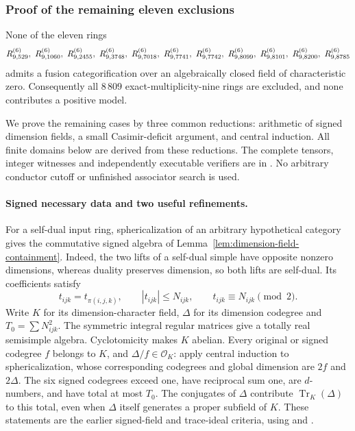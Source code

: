 \subsubsection{Proof of the remaining eleven exclusions}
\label{sec:m9-completion}

\begin{theorem}\label{thm:m9-completion}
None of the eleven rings
\[
 \RR{9}{529},\ \RR{9}{1060},\ \RR{9}{2455},\ \RR{9}{3748},\
 \RR{9}{7018},\ \RR{9}{7741},\ \RR{9}{7742},\
 \RR{9}{8099},\ \RR{9}{8101},\ \RR{9}{8200},\ \RR{9}{8785}
\]
admits a fusion categorification over an algebraically closed field of
characteristic zero. Consequently all $8\,809$ exact-multiplicity-nine
rings are excluded, and none contributes a positive model.
\end{theorem}

We prove the remaining cases by three common reductions: arithmetic of
signed dimension fields, a small Casimir-deficit argument, and central
induction. All finite domains below are derived from these reductions.
The complete tensors, integer witnesses and independently executable
verifiers are in \filename{research/exclusions/m9_completion/}.
No arbitrary conductor cutoff or unfinished associator search is used.

\paragraph{Signed necessary data and two useful refinements.}
For a self-dual input ring, sphericalization of an arbitrary hypothetical
category gives the commutative signed algebra of
Lemma~\ref{lem:dimension-field-containment}. Indeed, the two lifts of a
self-dual simple have opposite nonzero dimensions, whereas duality
preserves dimension, so both lifts are self-dual. Its coefficients satisfy
\[
 t_{ijk}=t_{\pi(i,j,k)},\qquad |t_{ijk}|\le N_{ijk},\qquad
 t_{ijk}\equiv N_{ijk}\pmod2.
\]
Write $K$ for its dimension-character field, $\Delta$ for its dimension
codegree and $T_0=\sum N_{ijk}^2$. The symmetric integral regular matrices
give a totally real semisimple algebra. Cyclotomicity makes $K$ abelian.
Every original or signed codegree $f$ belongs to $K$, and
$\Delta/f\in\mathcal O_K$: apply central induction to sphericalization,
whose corresponding codegrees and global dimension are $2f$ and
$2\Delta$. The six signed codegrees exceed one, have reciprocal sum one,
are $d$-numbers, and have total at most $T_0$. The conjugates of $\Delta$
contribute $\operatorname{Tr}_K(\Delta)$ to this total, even when
$\Delta$ itself generates a proper subfield of $K$.
These statements are the earlier signed-field and trace-ideal criteria,
using \cite[Section~5.1 and Theorem~2.13]{Ostrik3} and
\cite[Theorem~1.2 and Corollary~1.4]{Ocode}.

